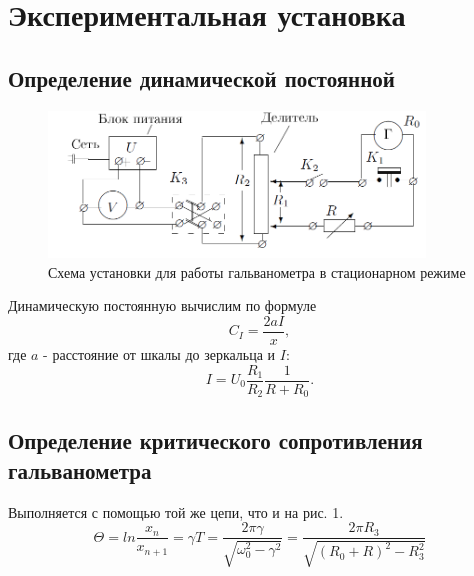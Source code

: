 \documentclass[a4paper]{article}
\begin{document}
\section{Экспериментальная установка}
\subsection{Определение динамической постоянной}
\begin{figure}[H]
    \centering
    \includegraphics[width=10cm]{fig2.PNG}
    \caption{Схема установки для работы гальванометра в стационарном режиме}
    \label{fig:vac}
\end{figure}
Динамическую постоянную вычислим по формуле
\begin{equation}
    C_I = \frac{2aI}{x},
\end{equation}
где $a$ - расстояние от шкалы до зеркальца и $I$:
\begin{equation}
    I = U_0 \frac{R_1}{R_2} \frac{1}{R + R_0}.
\end{equation}

\subsection{Определение критического сопротивления гальванометра}
Выполняется с помощью той же цепи, что и на рис. 1.
\begin{equation}
    \Theta = ln\frac{x_n}{x_{n+1}} = \gamma T = \frac{2\pi \gamma}{\sqrt{\omega_0^2 - \gamma^2}} = \frac{2\pi R_3}{\sqrt{(R_0 + R)^2 - R_3^2}}
\end{equation}
\end{document}
